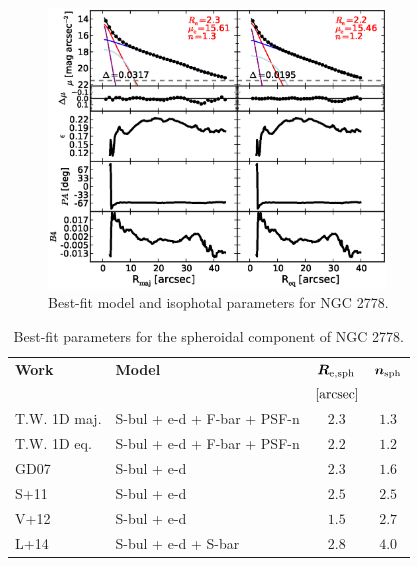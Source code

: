 \documentclass[preprint2]{emulateapj}
\newcommand{\fitfigurewidth}{0.8\textwidth}
\begin{document}
  \begin{figure}[h]
  \begin{center}
  \includegraphics[width=\fitfigurewidth]{images/n2778_1Dfit.eps}
  \caption{Best-fit model and isophotal parameters for NGC 2778.}
  \end{center}
  \end{figure}

  \begin{table}[h]
  \small
  \caption{Best-fit parameters for the spheroidal component of NGC 2778.}
  \begin{center}
  \begin{tabular}{llcc}
  \hline
  {\bf Work} & {\bf Model}   & $\bm R_{\rm e,sph}$    & $\bm n_{\rm sph}$ \\
    &  &  $[\rm arcsec]$ & \\
  \hline
  T.W. 1D maj. & S-bul + e-d + F-bar + PSF-n & $2.3$  &  $1.3$ \\
  T.W. 1D eq.  & S-bul + e-d + F-bar + PSF-n & $2.2$  &  $1.2$ \\
  \hline
  GD07         & S-bul + e-d	     & $2.3$  &  $1.6$ \\
  S+11         & S-bul + e-d	     & $2.5$  &  $2.5$ \\
  V+12         & S-bul + e-d	     & $1.5$  &  $2.7$ \\
  L+14         & S-bul + e-d + S-bar & $2.8$  &  $4.0$ \\
  \hline
  \end{tabular}
  \end{center}
  \label{tab:n2778}
  \end{table}
\end{document}
